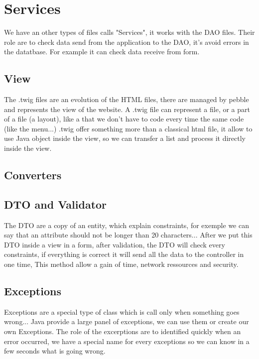 \section{Services}

We have an other types of files calls "Services", it works with the DAO files.
Their role are to check data send from the application to the DAO, it's avoid errors in the datatbase.
For example it can check data receive from form.


\subsection{View}

The .twig files are an evolution of the HTML files, there are managed by pebble and represents the view of the website.
A .twig file can represent a file, or a part of a file (a layout), like a that we don't have to code every time the same code (like the menu...)
.twig offer something more than a classical html file, it allow to use Java object inside the view, so we can transfer a list and process it directly inside the view.


\subsection{Converters}

\subsection{DTO and Validator}

The DTO are a copy of an entity, which explain constraints, for exemple we can say that an attribute should not be longer than 20 characters...
After we put this DTO inside a view in a form, after validation, the DTO will check every constraints, if everything is correct it will send all the data to the controller in one time,
This method allow a gain of time, network ressources and security.

\subsection{Exceptions}

Exceptions are a special type of class which is call only when something goes wrong...
Java provide a large panel of exceptions, we can use them or create our own Exceptions.
The role of the excerptions are to identified quickly when an error occurred, we have a special name for every exceptions so we can know in a few seconds what is going wrong.


